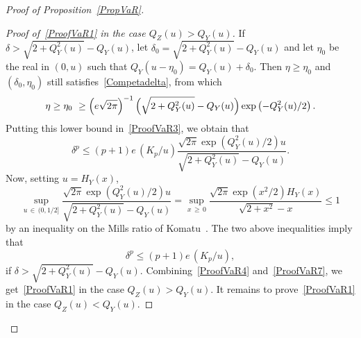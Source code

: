 \documentclass[AHL,Unicode,longabstracts,published]{cedram}
\begin{document}
\begin{proof}[{Proof of Proposition~\ref{PropVaR}}]
\begin{proof}[{Proof of~\eqref{ProofVaR1} in the case $Q_Z (u) > Q_Y (u)$}]
If $\delta > \sqrt{2 + Q_Y^2 (u) } - Q_Y (u)$, let $\delta_0 = \sqrt{2 + Q_Y^2 (u) } - Q_Y (u)$ and let $\eta_0$ be the real in $(0,u)$ such that $Q_Y (u-\eta_0) = Q_Y (u) + \delta_0$. Then $\eta \geq \eta_0$ and $(\delta_0, \eta_0)$ still satisfies~\eqref{Competadelta}, from which
\begin{equation}\label{ProofVaR5}
\eta \geq \eta_0 \ \geq\left(e\sqrt{2\pi}\right)^{-1} \Bigl(\sqrt{2 + Q_Y^2 (u) } - Q_Y (u) \Bigr) \exp \left(- Q_Y^2 (u) /2\right).
\end{equation}
Putting this lower bound in~\eqref{ProofVaR3}, we obtain that
\begin{equation}\label{ProofVaR6}
\delta^p \leq (p+1)e \, (K_p/ u) \frac{ \sqrt{2\pi}\exp \left(Q_Y^2 (u) /2\right) u }{ \sqrt{2 + Q_Y^2 (u) } - Q_Y (u) }.
\end{equation}
Now, setting $u= H_Y (x)$,
\[
\sup_{u\,\in\,(0,1/2]} \frac{ \sqrt{2\pi}\exp \left(Q_Y^2 (u) /2\right) u }{ \sqrt{2 + Q_Y^2 (u) } - Q_Y (u) } =
\sup_{x\,\geq\,0} \frac{ \sqrt{2\pi}\exp \left(x^2/2\right) H_Y (x) }{ \sqrt{2 + x^2 } - x } \leq 1
\]
by an inequality on the Mills ratio of Komatu~\cite{Ko55}. The two above inequalities imply that
\begin{equation}\label{ProofVaR7}
\delta^p \leq (p+1)e \, (K_p/ u),
\end{equation}
if $\delta > \sqrt{2 + Q_Y^2 (u)} - Q_Y (u)$. Combining~\eqref{ProofVaR4} and~\eqref{ProofVaR7}, we get~\eqref{ProofVaR1} in the case $Q_Z (u)> Q_Y (u)$. It remains to prove~\eqref{ProofVaR1} in the case $Q_Z (u) < Q_Y (u)$.
\end{proof}



\end{proof}
\end{document}
